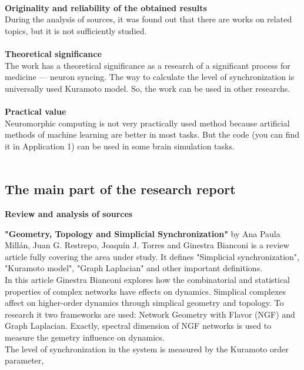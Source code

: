 \documentclass[draft]{article}
\newcommand\tab[1][1cm]{\hspace*{#1}}
\begin{document}
~\\
\textbf{Originality and reliability of the obtained results}\\
\tab During the analysis of sources, it was found out that there are works on related topics, but it is not sufficiently studied.\\
~\\
\textbf{Theoretical significance}\\
\tab The work has a theoretical significance as a research of a significant process for medicine — neuron syncing. The way to calculate the level of synchronization is universally used Kuramoto model. So, the work can be used in other researchs.\\
~\\
\textbf{Practical value}\\
\tab Neuromorphic computing is not very practically used method because artificial methods of machine learning are better in most tasks. But the code (you can find it in Application 1) can be used in some brain simulation tasks.\\
~\\
\newpage
\begin{center}
\section {The main part of the research report}
\end{center}
\begin{center}
\textbf{Review and analysis of sources}\\
\end{center}
\tab\textbf{"Geometry, Topology and Simplicial Synchronization"\cite{litlink3}} by Ana Paula Millán, Juan G. Restrepo, Joaquín J. Torres and Ginestra Bianconi is a review article fully covering the area under study. It defines "Simplicial synchronization", "Kuramoto model", "Graph Laplacian" and other important definitions. \\
\tab In this article Ginestra Bianconi explores how the combinatorial and statistical properties of complex networks have effects on dynamics. Simplical complexes affect on higher-order dynamics through simplical geometry and topology. To research it two frameworks are used: Network Geometry with Flavor (NGF) and Graph Laplacian. Exactly, spectral dimension of NGF networks is used to measure the gemetry influence on dynamics.\\
\tab The level of synchronization in the system is measured by the
Kuramoto order parameter,
\end{document}
